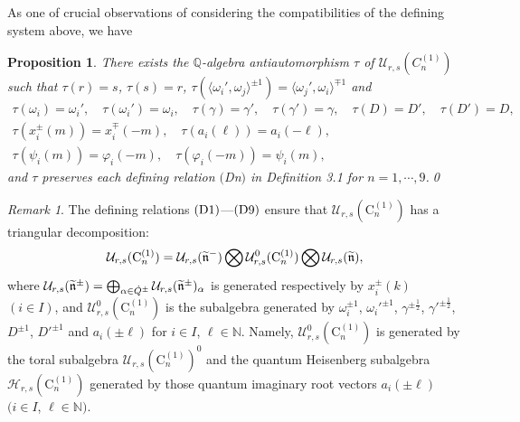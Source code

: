 \documentclass{amsproc}
\newtheorem{prop}[theo]{Proposition}
\theoremstyle{remark}
\newtheorem{remark}[theo]{Remark}
\numberwithin{equation}{section}
\begin{document}
\medskip
As one of crucial observations of considering the compatibilities of
the defining system above, we have
\begin{prop}
There exists the $\mathbb{Q}$-algebra antiautomorphism $\tau$ of
${\mathcal U}_{r,s}(C_n^{(1)})$  such that
$\tau(r)=s$, $\tau(s)=r$,
$\tau({\langle}{\omega}_i',{\omega}_j{\rangle}^{\pm1})={\langle}{\omega}_j',{\omega}_i{\rangle}^{\mp1}$ and
\begin{gather*}
\tau({\omega}_i)={\omega}_i',\quad \tau({\omega}_i')={\omega}_i,\quad
\tau(\gamma)=\gamma',\quad \tau(\gamma')=\gamma,\quad\tau(D)=D',\quad \tau(D')=D,\\
\tau(x_i^{\pm}(m))=x_i^{\mp}(-m), \quad
\tau(a_i(\ell))=a_i(-\ell),\\
\tau(\psi_i(m))=\varphi_i(-m), \quad\tau(\varphi_i(-m))=\psi_i(m),
\end{gather*}
and $\tau$ preserves each defining relation $($\hbox{{\rm D}n}$)$ in
Definition 3.1 for $n=1, \cdots, 9$.\hfill\qed
\end{prop}
\begin{remark}The defining relations $(\rm{D1})$---$(\rm{D9})$ ensure that
$\mathcal{U}_{r,s}(\mathrm{C}_n^{(1)})$ has a triangular
decomposition:
$$\mathcal{U}_{r,s}(\mathrm{C}_n^{(1)})=
\mathcal{U}_{r,s}(\widetilde{\frak{n}}^-)\bigotimes\mathcal{U}_{r,s}^0(\mathrm{C}_n^{(1)})
\bigotimes\mathcal{U}_{r,s}(\widetilde{\frak{n}}),$$ where
$\mathcal{U}_{r,s}(\widetilde{\frak{n}}^\pm)=\bigoplus_{\alpha\in\dot
Q^\pm}\mathcal{U}_{r,s}(\widetilde{\frak{n}}^\pm)_\alpha$ is
generated respectively by $x_i^\pm(k)$ $(i\in I)$, and
$\mathcal{U}_{r,s}^0(\mathrm{C}_n^{(1)})$ is the subalgebra
generated by ${\omega}_i^{\pm1}$, ${\omega}_i'^{\pm1}$,
$\gamma^{\pm\frac1{2}}$, $\gamma'^{\pm\frac1{2}}$, $D^{\pm1}$,
$D'^{\pm1}$ and $a_i(\pm\ell)$ for $i\in I$, $\ell\in \mathbb{N}$.
Namely, $\mathcal{U}_{r,s}^0(\mathrm{C}_n^{(1)})$ is generated by
the toral subalgebra $\mathcal{U}_{r,s}(\mathrm{C}_n^{(1)})^0$ and
the quantum Heisenberg subalgebra $\mathcal
H_{r,s}(\mathrm{C}_n^{(1)})$ generated by those quantum imaginary
root vectors $a_i(\pm\ell)$ $(i\in I$, $\ell\in \mathbb{N})$.
\end{remark}
\end{document}
